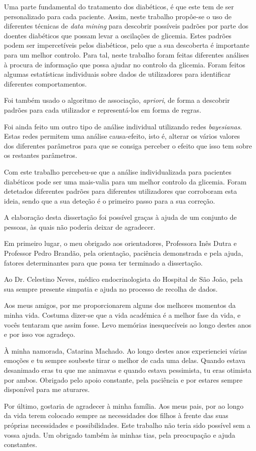 Uma parte fundamental do tratamento dos diabéticos, é que este tem de ser personalizado para cada paciente. Assim, neste trabalho propôe-se o uso de diferentes técnicas de \textit{data mining} para descobrir possíveis padrões por parte dos doentes diabéticos que possam levar a oscilações de glicemia. Estes padrões podem ser impercetíveis pelos diabéticos, pelo que a sua descoberta é importante para um melhor controlo. Para tal, neste trabalho foram feitas diferentes análises à procura de informação que possa ajudar no controlo da glicemia. Foram feitos algumas estatísticas individuais sobre dados de utilizadores para identificar diferentes comportamentos.

Foi também usado o algoritmo de associação, \textit{apriori}, de forma a descobrir padrões para cada utilizador e representá-los em forma de regras. 

Foi ainda feito um outro tipo de análise individual utilizando redes \textit{bayesianas}. Estas redes permitem uma análise causa-efeito, isto é, alterar os vários valores dos diferentes parâmetros para que se consiga perceber o efeito que isso tem sobre os restantes parâmetros.

Com este trabalho percebeu-se que a análise individualizada para pacientes diabéticos pode ser uma mais-valia para um melhor controlo da glicemia. Foram detetados diferentes padrões para diferentes utilizadores que corroboram esta ideia, sendo que a sua deteção é o primeiro passo para a sua correção.



A elaboração desta dissertação foi possível graças à ajuda de um conjunto de pessoas, às quais não poderia deixar de agradecer.

Em primeiro lugar, o meu obrigado aos orientadores, Professora Inês Dutra e Professor Pedro Brandão, pela orientação, paciência demonstrada e pela ajuda, fatores determinantes para que possa ter terminado a dissertação.

Ao Dr. Celestino Neves, médico endocrinologista do Hospital de São João, pela sua sempre presente simpatia e ajuda no processo de recolha de dados.

Aos meus amigos, por me proporcionarem alguns dos melhores momentos da minha vida. Costuma dizer-se que a vida académica é a melhor fase da vida, e vocês tentaram que assim fosse. Levo memórias inesquecíveis ao longo destes anos e por isso vos agradeço.

À minha namorada, Catarina Machado. Ao longo destes anos experienciei várias emoções e tu sempre soubeste tirar o melhor de cada uma delas. Quando estava desanimado eras tu que me animavas e quando estava pessimista, tu eras otimista por ambos. Obrigado pelo apoio constante, pela paciência e por estares sempre disponível para me aturares.

Por último, gostaria de agradecer à minha família. Aos meus pais, por ao longo da vida terem colocado sempre as necessidades dos filhos à frente das suas próprias necessidades e possibilidades. Este trabalho não teria sido possível sem a vossa ajuda. Um obrigado também às minhas tias, pela preocupação e ajuda constantes.
